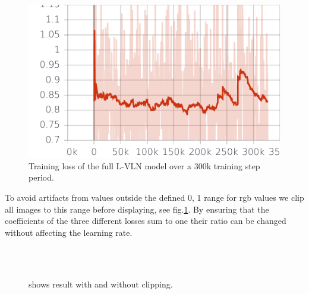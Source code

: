 \documentclass[runningheads,a4paper]{llncs}
\begin{document}
\begin{figure}[htb]
\includegraphics[scale=0.75]{res/train_loss_three_frame.pdf}
\caption{ Training loss of the full L-VLN model over a 300k training step period. }
\end{figure}

To avoid artifacts from values outside the defined 0, 1 range for rgb values we clip all images to this range before displaying, see fig.\ref{fig:artifact}.
By ensuring that the coefficients of the three different losses sum to one their ratio can be changed without affecting the learning rate.

\begin{figure}[H]
\captionsetup[subfigure]{width=0.2\textwidth}
 \advance\leftskip-4cm
  \ \subfloat[\label{label-1}]{} \\[\topskip]
  \ \subfloat[\label{label-2}]{}
  \caption{ shows result with \protect{} and without \protect{} clipping. }
  \label{fig:artifact}
\end{figure}
\end{document}

